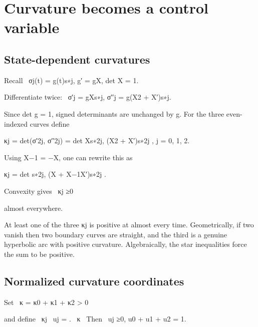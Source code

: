 \chapter{Curvature becomes a control variable}
\section{State-dependent curvatures}

\begin{displaytext}
Recall \
σj(t) = g(t)s∗j, g′ = gX, det X = 1.
\end{displaytext}

\begin{displaytext}
Differentiate twice: \
σ′j = gXs∗j, σ′′j = g(X2 + X′)s∗j.
\end{displaytext}

Since det g = 1, signed determinants are unchanged by g. For the three even-indexed curves define


\begin{displaytext}
κj = det(σ′2j, σ′′2j) = det Xs∗2j, (X2 + X′)s∗2j , j = 0, 1, 2.
\end{displaytext}

Using X−1 = −X, one can rewrite this as


\begin{displaytext}
κj = det s∗2j, (X + X−1X′)s∗2j .
\end{displaytext}

\begin{displaytext}
Convexity gives \
κj ≥0
\end{displaytext}

almost everywhere.


At least one of the three κj is positive at almost every time. Geometrically, if two vanish then two boundary curves are straight, and the third is a genuine hyperbolic arc with positive curvature. Algebraically, the star inequalities force the sum to be positive.


\section{Normalized curvature coordinates}

\begin{displaytext}
Set \
κ = κ0 + κ1 + κ2 > 0
\end{displaytext}

\begin{displaytext}
and define \
κj \
uj = . \
κ \
Then \
uj ≥0, u0 + u1 + u2 = 1.
\end{displaytext}

